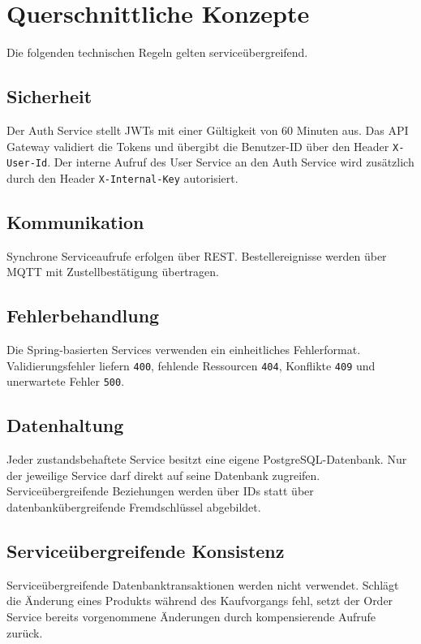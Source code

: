 \section{Querschnittliche Konzepte}

Die folgenden technischen Regeln gelten serviceübergreifend.

\subsection{Sicherheit}

Der Auth Service stellt JWTs mit einer Gültigkeit von 60 Minuten aus.
Das API Gateway validiert die Tokens und übergibt die Benutzer-ID über den Header \texttt{X-User-Id}.
Der interne Aufruf des User Service an den Auth Service wird zusätzlich durch den Header \texttt{X-Internal-Key} autorisiert.
\subsection{Kommunikation}

Synchrone Serviceaufrufe erfolgen über REST.
Bestellereignisse werden über MQTT mit Zustellbestätigung übertragen.

\subsection{Fehlerbehandlung}

Die Spring-basierten Services verwenden ein einheitliches Fehlerformat.
Validierungsfehler liefern \texttt{400}, fehlende Ressourcen \texttt{404}, Konflikte \texttt{409} und
unerwartete Fehler \texttt{500}.

\subsection{Datenhaltung}

Jeder zustandsbehaftete Service besitzt eine eigene PostgreSQL-Datenbank.
Nur der jeweilige Service darf direkt auf seine Datenbank zugreifen.
Serviceübergreifende Beziehungen werden über IDs statt über
datenbankübergreifende Fremdschlüssel abgebildet.

\subsection{Serviceübergreifende Konsistenz}

Serviceübergreifende Datenbanktransaktionen werden nicht verwendet.
Schlägt die Änderung eines Produkts während des Kaufvorgangs fehl, setzt der
Order Service bereits vorgenommene Änderungen durch kompensierende Aufrufe
zurück.

